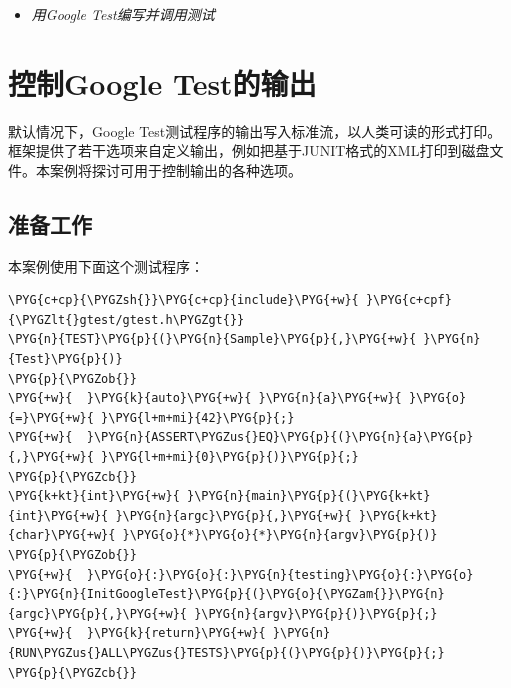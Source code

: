 
\begin{itemize}
\item \textit{用Google Test编写并调用测试}

\end{itemize}



\section{控制Google Test的输出}



默认情况下，Google Test测试程序的输出写入标准流，以人类可读的形式打印。框架提供了若干选项来自定义输出，例如把基于JUNIT格式的XML打印到磁盘文件。本案例将探讨可用于控制输出的各种选项。



\subsection{准备工作}



本案例使用下面这个测试程序：



\begin{codeblockbg}
\begin{Verbatim}[commandchars=\\\{\},breaklines=true,breakanywhere=true,fontsize=\codefont,xleftmargin=17bp]
\PYG{c+cp}{\PYGZsh{}}\PYG{c+cp}{include}\PYG{+w}{ }\PYG{c+cpf}{\PYGZlt{}gtest/gtest.h\PYGZgt{}}
\PYG{n}{TEST}\PYG{p}{(}\PYG{n}{Sample}\PYG{p}{,}\PYG{+w}{ }\PYG{n}{Test}\PYG{p}{)}
\PYG{p}{\PYGZob{}}
\PYG{+w}{  }\PYG{k}{auto}\PYG{+w}{ }\PYG{n}{a}\PYG{+w}{ }\PYG{o}{=}\PYG{+w}{ }\PYG{l+m+mi}{42}\PYG{p}{;}
\PYG{+w}{  }\PYG{n}{ASSERT\PYGZus{}EQ}\PYG{p}{(}\PYG{n}{a}\PYG{p}{,}\PYG{+w}{ }\PYG{l+m+mi}{0}\PYG{p}{)}\PYG{p}{;}
\PYG{p}{\PYGZcb{}}
\PYG{k+kt}{int}\PYG{+w}{ }\PYG{n}{main}\PYG{p}{(}\PYG{k+kt}{int}\PYG{+w}{ }\PYG{n}{argc}\PYG{p}{,}\PYG{+w}{ }\PYG{k+kt}{char}\PYG{+w}{ }\PYG{o}{*}\PYG{o}{*}\PYG{n}{argv}\PYG{p}{)}
\PYG{p}{\PYGZob{}}
\PYG{+w}{  }\PYG{o}{:}\PYG{o}{:}\PYG{n}{testing}\PYG{o}{:}\PYG{o}{:}\PYG{n}{InitGoogleTest}\PYG{p}{(}\PYG{o}{\PYGZam{}}\PYG{n}{argc}\PYG{p}{,}\PYG{+w}{ }\PYG{n}{argv}\PYG{p}{)}\PYG{p}{;}
\PYG{+w}{  }\PYG{k}{return}\PYG{+w}{ }\PYG{n}{RUN\PYGZus{}ALL\PYGZus{}TESTS}\PYG{p}{(}\PYG{p}{)}\PYG{p}{;}
\PYG{p}{\PYGZcb{}}
\end{Verbatim}
\end{codeblockbg}


